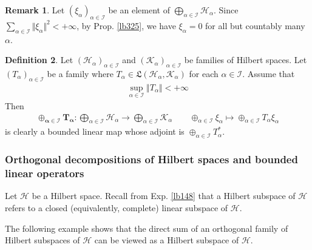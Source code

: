 \documentclass[12pt,b5paper,notitlepage]{article}
\theoremstyle{definition}
\newtheorem{df}{Definition}[subsection]
\newtheorem{rem}[df]{Remark}
\theoremstyle{plain}
\newcommand{\fk}{\mathfrak}
\newcommand{\MH}{\mathcal H}
\newcommand{\MK}{\mathcal K}
\newcommand{\SI}{\mathscr I}
\numberwithin{equation}{section}
\begin{document}
\begin{rem}\label{lb333}
Let $(\xi_\alpha)_{\alpha\in\SI}$ be an element of $\bigoplus_{\alpha\in\SI}\MH_\alpha$. Since $\sum_{\alpha\in\SI}\Vert\xi_\alpha\Vert^2<+\infty$, by Prop. \ref{lb325}, we have $\xi_\alpha=0$ for all but countably many $\alpha$.
\end{rem}



\begin{df}
Let $(\MH_\alpha)_{\alpha\in\SI}$ and $(\MK_\alpha)_{\alpha\in\SI}$ be families of Hilbert spaces. Let $(T_\alpha)_{\alpha\in\SI}$ be a family where $T_\alpha\in\fk L(\MH_\alpha,\MK_\alpha)$ for each $\alpha\in\SI$. Assume that
\begin{align*}
\sup_{\alpha\in\SI}\Vert T_\alpha\Vert<+\infty
\end{align*}
Then \index{T@$\oplus_{\alpha\in\SI}T_\alpha$}
\begin{gather*}
\pmb{\oplus_{\alpha\in\SI}T_\alpha}:\bigoplus_{\alpha\in\SI}\MH_\alpha\rightarrow\bigoplus_{\alpha\in\SI}\MK_\alpha\qquad \oplus_{\alpha\in\SI}\xi_\alpha\mapsto\oplus_{\alpha\in\SI}T_\alpha\xi_\alpha
\end{gather*}
is clearly a bounded linear map whose adjoint is $\oplus_{\alpha\in\SI}T_\alpha^*$. 
\end{df}


\subsubsection{Orthogonal decompositions of Hilbert spaces and bounded linear operators}

Let $\MH$ be a Hilbert space. Recall from Exp. \ref{lb148} that a Hilbert subspace of $\MH$ refers to a closed (equivalently, complete) linear subspace of $\MH$.

The following example shows that the direct sum of an orthogonal family of Hilbert subspaces of $\MH$ can be viewed as a Hilbert subspace of $\MH$.
\end{document}
